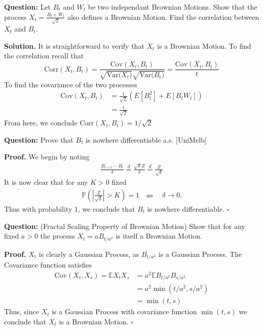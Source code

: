 \documentclass{article}
\begin{document}
\begin{tcolorbox}[colframe=black,colback=gray!5,boxrule=0.5pt]
\textbf{Question:} Let $B_t$ and $W_t$ be two independant Brownian Motions. Show that the process $X_t = \frac{B_t + W_t}{\sqrt{2}}$ also defines a Brownian Motion. Find the correlation between $X_t$ and $B_t$. 
\end{tcolorbox}
\textbf{Solution.} It is straightforward to verify that $X_t$ is a Brownian Motion. To find the correlation recall that 
$$\text{Corr}(X_t, B_t) = \frac{\text{Cov}(X_t, B_t)}{\sqrt{\text{Var($X_t$)}}\sqrt{\text{Var($B_t$)}}} = \frac{\text{Cov}(X_t, B_t)}{t}$$
To find the covariance of the two processes
\begin{align*}
    \text{Cov}(X_t ,B_t) &= \frac{1}{\sqrt{2}}(E[B_t^2] + E[B_tW_t]) \\
    &= \frac{t}{\sqrt{2}}
\end{align*}
From here, we conclude Corr$(X_t, B_t) = 1/\sqrt{2}$

\begin{tcolorbox}[colframe=black,colback=gray!5,boxrule=0.5pt]
\textbf{Question:} Prove that $B_t$ is nowhere differentiable a.s. [UniMelb]  
\end{tcolorbox}
\textbf{Proof.} We begin by noting 
\begin{align*}
    \frac{B_{t+\delta} - B_t}{\delta} \stackrel{d}{=} \frac{\sqrt{\delta} Z}{\delta} \stackrel{d}{=} \frac{Z}{\sqrt{\delta}}
\end{align*}
It is now clear that for any $K > 0$ fixed
\begin{align*}
    \mathbb{P}\left(\left|\frac{Z}{\sqrt{\delta}}\right| > K \right) =1 \quad \text{as } \quad \delta\to0. 
\end{align*}
Thus with probability 1, we conclude that $B_t$ is nowhere differentiable. $\square$

\begin{tcolorbox}[colframe=black,colback=gray!5,boxrule=0.5pt]
\textbf{Question:} (Fractal Scaling Property of Brownian Motion) Show that for any fixed $a>0$  the process $X_t = aB_{t/a^2}$ is itself a Brownian Motion.  
\end{tcolorbox}
\textbf{Proof.} $X_t$ is clearly a Gaussian Process, as $B_{t/a^2}$ is a Gaussian Process. The Covariance function satisfies 
\begin{align*}
    \text{Cov}(X_t,X_s) = \mathbb{E}X_tX_s &= a^2\mathbb{E}B_{t/a^2}B_{s/a^2} \\
    &= a^2\min(t/a^2, s/a^2) \\
    &= \min(t,s)
\end{align*}
Thus, since $X_t$ is a Gaussian Process with covariance function $\min(t,s)$ we conclude that $X_t$ is a Brownian Motion. $\square$
\end{document}
